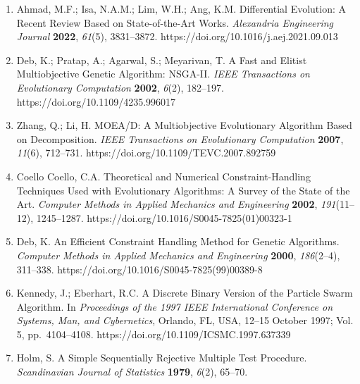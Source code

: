 \documentclass[
  10pt,
  a4paper,
]{article}
\begin{document}
\begin{enumerate}
  Wang, Y.; Cai, Z.; Zhang, Q. Differential Evolution with Composite
  Trial Vector Generation Strategies and Control Parameters. \emph{IEEE
  Transactions on Evolutionary Computation} \textbf{2011}, \emph{15}(1),
  55--66. https://doi.org/10.1109/TEVC.2010.2087271
\item
  Ahmad, M.F.; Isa, N.A.M.; Lim, W.H.; Ang, K.M. Differential Evolution:
  A Recent Review Based on State-of-the-Art Works. \emph{Alexandria
  Engineering Journal} \textbf{2022}, \emph{61}(5), 3831--3872.
  https://doi.org/10.1016/j.aej.2021.09.013
\item
  Deb, K.; Pratap, A.; Agarwal, S.; Meyarivan, T. A Fast and Elitist
  Multiobjective Genetic Algorithm: NSGA-II. \emph{IEEE Transactions on
  Evolutionary Computation} \textbf{2002}, \emph{6}(2), 182--197.
  https://doi.org/10.1109/4235.996017
\item
  Zhang, Q.; Li, H. MOEA/D: A Multiobjective Evolutionary Algorithm
  Based on Decomposition. \emph{IEEE Transactions on Evolutionary
  Computation} \textbf{2007}, \emph{11}(6), 712--731.
  https://doi.org/10.1109/TEVC.2007.892759
\item
  Coello Coello, C.A. Theoretical and Numerical Constraint-Handling
  Techniques Used with Evolutionary Algorithms: A Survey of the State of
  the Art. \emph{Computer Methods in Applied Mechanics and Engineering}
  \textbf{2002}, \emph{191}(11--12), 1245--1287.
  https://doi.org/10.1016/S0045-7825(01)00323-1
\item
  Deb, K. An Efficient Constraint Handling Method for Genetic
  Algorithms. \emph{Computer Methods in Applied Mechanics and
  Engineering} \textbf{2000}, \emph{186}(2--4), 311--338.
  https://doi.org/10.1016/S0045-7825(99)00389-8
\item
  Kennedy, J.; Eberhart, R.C. A Discrete Binary Version of the Particle
  Swarm Algorithm. In \emph{Proceedings of the 1997 IEEE International
  Conference on Systems, Man, and Cybernetics}, Orlando, FL, USA, 12--15
  October 1997; Vol. 5, pp.~4104--4108.
  https://doi.org/10.1109/ICSMC.1997.637339
\item
  Holm, S. A Simple Sequentially Rejective Multiple Test Procedure.
  \emph{Scandinavian Journal of Statistics} \textbf{1979}, \emph{6}(2),
  65--70.
\end{enumerate}
\end{document}

